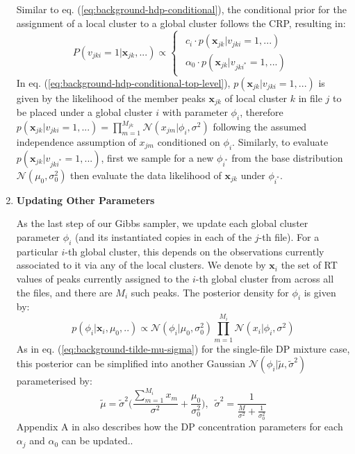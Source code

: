 \begin{enumerate}
Similar to eq. (\ref{eq:background-hdp-conditional}), the conditional prior for the assignment of a local cluster to a global cluster follows the CRP, resulting in:
\begin{dmath}
P(v_{jki}=1 \vert \boldsymbol{x}_{jk}, ...)\propto\begin{cases}
\begin{array}{c}
c_{i}\cdot p(\boldsymbol{x}_{jk} \vert v_{jki}=1,...)\\
\alpha_{0}\cdot p(\boldsymbol{x}_{jk} \vert v_{jki^{*}}=1,...)
\end{array}\end{cases}\label{eq:background-hdp-conditional-top-level}
\end{dmath}
In eq. (\ref{eq:background-hdp-conditional-top-level}), $p(\boldsymbol{x}_{jk} \vert v_{jki}=1,...)$ is given by the likelihood of the member peaks $\boldsymbol{x}_{jk}$ of local cluster $k$ in file $j$ to be placed under a global cluster $i$ with parameter $\phi_{i}$, therefore $p(\boldsymbol{x}_{jk} \vert v_{jki}=1,...) = \prod_{m=1}^{M_{jk}} \mathcal{N}(x_{jm} \vert \phi_{i}, \sigma^2)$ following the assumed independence assumption of $x_{jm}$ conditioned on $\phi_{i}$. Similarly, to evaluate $p(\boldsymbol{x}_{jk} \vert v_{jki^{*}}=1,...)$, first we sample for a new $\phi_{i^{*}}$ from the base distribution $\mathcal{N}(\mu_0, \sigma_0^2)$ then evaluate the data likelihood of $\boldsymbol{x}_{jk}$ under $\phi_{i^{*}}$. 

\item \textbf{Updating Other Parameters}

As the last step of our Gibbs sampler, we update each global cluster parameter $\phi_i$ (and its instantiated copies in each of the $j$-th file). For a particular $i$-th global cluster, this depends on the observations currently associated to it via any of the local clusters. We denote by $\boldsymbol{x}_{i}$ the set of RT values of peaks currently assigned to the $i$-th global cluster from across all the files, and there are $M_i$ such peaks. The posterior density for $\phi_i$ is given by:
\begin{equation}
p(\phi_i \vert \boldsymbol{x}_i, \mu_0, ..) \propto \mathcal{N}(\phi_i \vert \mu_0, \sigma_0^2) \prod_{m=1}^{M_i} \mathcal{N}(x_i \vert \phi_i, \sigma^2)
\label{eq:background-tilde-hdp-parameters-update}
\end{equation}
As in eq. (\ref{eq:background-tilde-mu-sigma}) for the single-file DP mixture case, this posterior can be simplified into another Gaussian $\mathcal{N}(\phi_i \vert \tilde{\mu}, \tilde{\sigma}^2)$ parameterised by:
\begin{equation}
\tilde{\mu} = \tilde{\sigma}^2 \bigg( \frac{\sum_{m=1}^{M_i} x_m}{\sigma^2} + \frac{\mu_0}{\sigma_0^2} \bigg), \enspace
\tilde{\sigma}^2 = \frac{1}{\frac{M}{\sigma^2} + \frac{1}{\sigma^2_0}} 
\label{eq:background-tilde-hdp-posterior}
\end{equation}
Appendix A in \cite{teh2012hierarchical} also describes how the DP concentration parameters for each $\alpha_j$ and $\alpha_0$ can be updated..

\end{enumerate}

